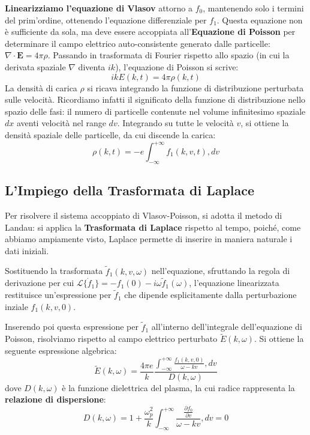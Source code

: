 \textbf{Linearizziamo l'equazione di Vlasov} attorno a $f_0$, mantenendo solo i termini del prim'ordine, ottenendo l'equazione differenziale per $f_1$. Questa equazione non è sufficiente da sola, ma deve essere accoppiata all'\textbf{Equazione di Poisson} per determinare il campo elettrico auto-consistente generato dalle particelle: $\nabla \cdot \mathbf{E} = 4\pi \rho$.
Passando in trasformata di Fourier rispetto allo spazio (in cui la derivata spaziale $\nabla$ diventa $ik$), l'equazione di Poisson si scrive:
\begin{equation}
ik E(k,t) = 4\pi \rho(k,t)
\end{equation}
La densità di carica $\rho$ si ricava integrando la funzione di distribuzione perturbata sulle velocità. Ricordiamo infatti il significato della funzione di distribuzione nello spazio delle fasi: il numero di particelle contenute nel volume infinitesimo spaziale $dx$ aventi velocità nel range $dv$. Integrando su tutte le velocità $v$, si ottiene la densità spaziale delle particelle, da cui discende la carica:
\begin{equation}
\rho(k,t) = -e \int_{-\infty}^{+\infty} f_1(k,v,t) , dv
\end{equation}

\subsection{L'Impiego della Trasformata di Laplace}
Per risolvere il sistema accoppiato di Vlasov-Poisson, si adotta il metodo di Landau: si applica la \textbf{Trasformata di Laplace} rispetto al tempo, poiché, come abbiamo ampiamente visto, Laplace permette di inserire in maniera naturale i dati iniziali.

Sostituendo la trasformata $\tilde{f}_1(k,v,\omega)$ nell'equazione, sfruttando la regola di derivazione per cui $\mathcal{L}\{\dot{f}_1\} = -f_1(0) - i\omega \tilde{f}_1(\omega)$, l'equazione linearizzata restituisce un'espressione per $\tilde{f}_1$ che dipende esplicitamente dalla perturbazione inziale $f_1(k,v,0)$.

Inserendo poi questa espressione per $\tilde{f}_1$ all'interno dell'integrale dell'equazione di Poisson, risolviamo rispetto al campo elettrico perturbato $\tilde{E}(k,\omega)$. Si ottiene la seguente espressione algebrica:
\begin{equation}
\tilde{E}(k,\omega) = \frac{4\pi e}{k} \frac{\displaystyle\int_{-\infty}^{+\infty} \frac{f_1(k,v,0)}{\omega - kv} , dv}{D(k,\omega)}
\end{equation}
dove $D(k,\omega)$ è la funzione dielettrica del plasma, la cui radice rappresenta la \textbf{relazione di dispersione}:
\begin{equation}
D(k,\omega) = 1 + \frac{\omega_p^2}{k} \int_{-\infty}^{+\infty} \frac{\frac{\partial f_0}{\partial v}}{\omega - kv} , dv = 0
\end{equation}

